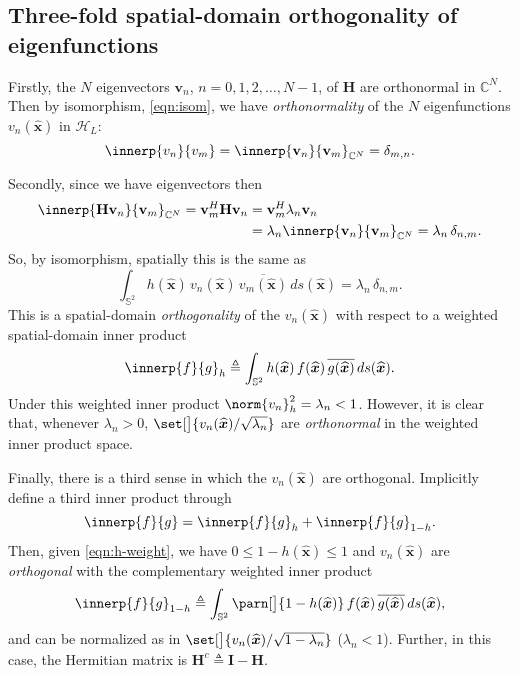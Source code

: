 \documentclass[10pt, twocolumn, twoside]{IEEEtran}
\newcommand{\untsph}{\mathbb{S}^{2}} %
\newcommand{\unit}[1]{\widehat{\bm{#1}}}
\newcommand{\cmplx}{\mathbb{C}} %
\newcommand{\dfn}{\triangleq}
\newcommand{\conj}[1]{\overline{#1}} %
\begin{document}


\subsection{Three-fold spatial-domain orthogonality of eigenfunctions}
\label{sec:tfsdoe}

Firstly, the $N$ eigenvectors $\mathbf{v}_n$, $n=0,1,2,\dotsc,N-1$, of $\mathbf{H}$ are orthonormal in $\cmplx^N$.  Then by isomorphism, \eqref{eqn:isom}, we have \emph{orthonormality} of the $N$ eigenfunctions $v_n(\unit{x})$ in $\mathcal{H}_{L}$:
\[
	\innerp{v_n}{v_m}
	=\innerp{\mathbf{v}_n}{\mathbf{v}_m}_{\cmplx^N}
	=\delta_{m,n}.
\]

Secondly, since we have eigenvectors then
\begin{align*}
	\innerp{\mathbf{H}\mathbf{v}_n}{\mathbf{v}_m}_{\cmplx^N}
	=\mathbf{v}_m^H\mathbf{H}\mathbf{v}_n
	&=\mathbf{v}_m^H\lambda_n\mathbf{v}_n \\
	&=\lambda_n\innerp{\mathbf{v}_n}{\mathbf{v}_m}_{\cmplx^N}
	=\lambda_n\,\delta_{n,m}.
\end{align*}
So, by isomorphism, spatially this is the same as
\[
	\int_{\untsph} h(\unit{x})\,v_n(\unit{x})\,
		\conj{v_m(\unit{x})}\,ds(\unit{x})=\lambda_n\,\delta_{n,m}.
\]
This is a spatial-domain \emph{orthogonality} of the $v_n(\unit{x})$ with respect to a weighted spatial-domain inner product %
\[
	\innerp{f}{g}_{h}\dfn\int_{\untsph} h(\unit{x})\,f(\unit{x})\,
		\conj{g(\unit{x})}\,ds(\unit{x}).
\]
Under this weighted inner product $\norm{v_n}^2_{h}=\lambda_n<1$.  However, it is clear that, whenever $\lambda_n>0$,
\(
	\set[\big]{{v_n(\unit{x})}/{\sqrt{\lambda_n}}}
\)
are \emph{orthonormal} in the weighted inner product space.

Finally, there is a third sense in which the $v_n(\unit{x})$ are orthogonal.  Implicitly define a third inner product through
\[
	\innerp{f}{g}=\innerp{f}{g}_{h}+\innerp{f}{g}_{1-h}.
\]
Then, given \eqref{eqn:h-weight}, we have $0\leq1-h(\unit{x})\leq1$ and $v_n(\unit{x})$ are \emph{orthogonal} with the complementary weighted inner product
\[
	\innerp{f}{g}_{1-h}\dfn\int_{\untsph} \parn[\big]{1-h(\unit{x})}\,f(\unit{x})\,
		\conj{g(\unit{x})}\,ds(\unit{x}),
\]
and can be normalized as in
\(
	\set[\big]{v_n(\unit{x})/{\sqrt{1-\lambda_n}}}
\)
 ($\lambda_n<1$).
Further, in this case, the Hermitian matrix is $\mathbf{H}^{c}\dfn\mathbf{I}-\mathbf{H}$.
\end{document}
